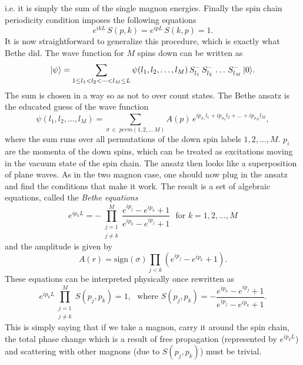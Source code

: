 i.e. it is simply the sum of the single magnon energies. 
Finally the spin chain periodicity condition imposes the following equations
\begin{equation}
	e^{ikL} \, S(p,k) = e^{ipL} \, S(k, p) = 1.
\end{equation}
It is now straightforward to generalize this procedure, which is exactly what Bethe did. 
The wave function for $M$ spins down can be written as
\begin{equation}
	|\psi\rangle = \sum_{1 \leq l_1 < l_2 < \dots < l_M \leq L} \psi(l_1, l_2, \dots, l_M) \, S^-_{l_1} \, S^-_{l_2} \, \dots \, S^-_{l_M} \, |0\rangle.
\end{equation}
The sum is chosen in a way so as not to over count states. The Bethe ansatz is the educated guess of the wave function
\begin{equation}
	\psi(l_1, l_2, \dots, l_M) = \sum_{\sigma \, \in \; perm(1,2,\dots\,M)} A(p) \, e^{ip_{\sigma_1} l_1 + ip_{\sigma_2} l_2 + \dots + ip_{\sigma_M} l_M}, 
\end{equation}
where the sum runs over all permutations of the down spin labels $1, 2, \dots, M$. 
$p_i$ are the momenta of the down spins, which can be treated as excitations moving in the vacuum state of the spin chain. 
The ansatz then looks like a superposition of plane waves. 
As in the two magnon case, one should now plug in the ansatz and find the conditions that make it work. 
The result is a set of algebraic equations, called the \emph{Bethe equations}
\begin{equation}
	e^{ip_k L} = - \prod_{\substack{j=1 \\ j \neq k}}^M \frac{e^{ip_j} - e^{ip_k} + 1}{e^{ip_k} - e^{ip_j} + 1} \,\,\,\, \mathrm{for} \,\, k = 1,2, \dots, M
	\label{eq:bethe_coordinate}
\end{equation}
and the amplitude is given by
\begin{equation}
	A(r) = \mathrm{sign}(\sigma) \prod_{j<k} \left( e^{ip_j} - e^{ip_k} + 1 \right).
\end{equation}
These equations can be interpreted physically once rewritten as
\begin{equation}
	e^{ip_k L} \prod_{\substack{j=1 \\ j \neq k}}^M S(p_j, p_k) = 1, \,\,\,\, \mathrm{where} \,\, S(p_j, p_k) = -\frac{e^{ip_k} - e^{ip_j} + 1}{e^{ip_j} - e^{ip_k} + 1}.
	\label{eq:CBA}
\end{equation}
This is simply saying that if we take a magnon, carry it around the spin chain, the total phase change which is a result of free propagation (represented by $e^{ip_k L}$) and scattering with other magnons (due to $S(p_j,p_k)$) must be trivial.  
